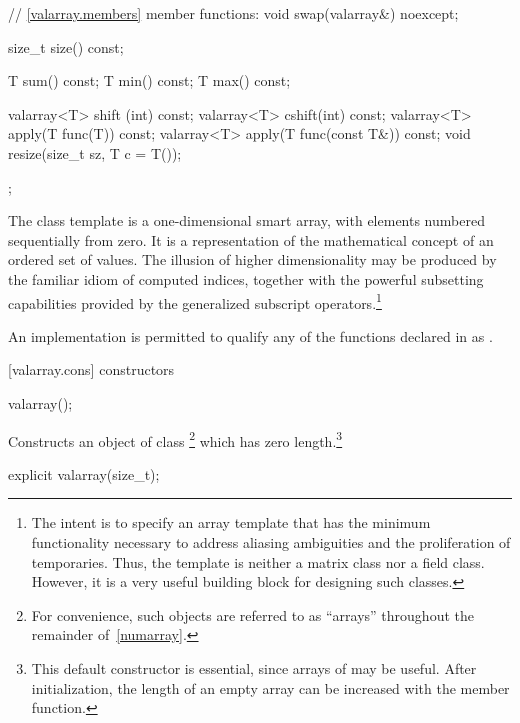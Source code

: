 \begin{codeblock}
{{    // \ref{valarray.members} member functions:
    void swap(valarray&) noexcept;

    size_t size() const;

    T sum() const;
    T min() const;
    T max() const;

    valarray<T> shift (int) const;
    valarray<T> cshift(int) const;
    valarray<T> apply(T func(T)) const;
    valarray<T> apply(T func(const T&)) const;
    void resize(size_t sz, T c = T());
  };
}
\end{codeblock}

\pnum
The
class template
is a
one-dimensional smart array, with elements numbered sequentially from zero.
It is a representation of the mathematical concept
of an ordered set of values.
The illusion of higher dimensionality
may be produced by the familiar idiom of computed indices, together
with the powerful subsetting capabilities provided
by the generalized subscript operators.\footnote{The intent is to specify
an array template that has the minimum functionality
necessary to address aliasing ambiguities and the proliferation of
temporaries.
Thus, the
template is neither a
matrix class nor a field class.
However, it is a very useful building block for designing such classes.}

\pnum
An implementation is permitted to qualify any of the functions declared in
as
.

[valarray.cons]{ constructors}

%
\begin{itemdecl}
valarray();
\end{itemdecl}

\begin{itemdescr}
\pnum
\effects
Constructs an object of class
\footnote{For convenience, such objects are referred
to as ``arrays'' throughout the
remainder of~\ref{numarray}.}
which has zero length.\footnote{This default constructor is essential,
since arrays of
may be useful.
After initialization, the length of an empty array can be increased with the
member function.}
\end{itemdescr}

%
\begin{itemdecl}
explicit valarray(size_t);
\end{itemdecl}

